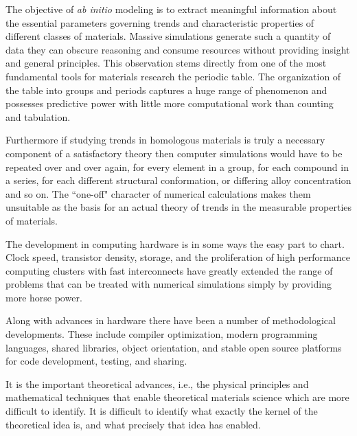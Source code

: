The objective of {\it ab initio} modeling is to extract meaningful information
about the essential parameters governing trends and characteristic properties 
of different classes of materials. Massive simulations generate such a quantity 
of data they can obscure reasoning and consume resources without providing insight 
and general principles. This observation stems directly from one of the
most fundamental tools for materials research the periodic table. The 
organization of the table into groups and periods captures a huge range 
of phenomenon and possesses predictive power with little more computational
work than counting and tabulation.

Furthermore if studying trends in homologous materials 
is truly a necessary component of a satisfactory
theory then computer simulations would have to be repeated 
over and over again, for every element in a group,
for each compound in a series, for each different structural conformation,
or differing alloy concentration and so on. The ``one-off" character of 
numerical calculations makes them unsuitable as the basis for an actual 
theory of trends in the measurable properties of materials.


The development in computing hardware is in some ways the easy part to chart. 
Clock speed, transistor density, storage, and the proliferation of high 
performance computing clusters with fast interconnects have greatly extended 
the range of problems that can be treated with numerical simulations
simply by providing more horse power.

Along with advances in hardware there have been a number
of methodological developments. These include compiler 
optimization, modern programming languages, 
shared libraries, object orientation, and stable open source 
platforms for code development, testing, and sharing. 

It is the important theoretical advances, i.e., the physical principles and
mathematical techniques that enable theoretical materials science 
which are more difficult to identify. It is difficult to identify what exactly 
the kernel of the theoretical idea is, and what precisely that idea has enabled. 

